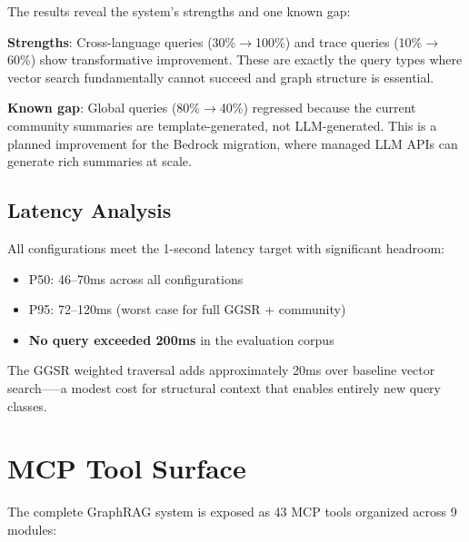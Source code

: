 \documentclass[11pt,letterpaper]{article}
\begin{document}
The results reveal the system's strengths and one known gap:

\textbf{Strengths}: Cross-language queries (30\%$\to$100\%) and trace
queries (10\%$\to$60\%) show transformative improvement. These are
exactly the query types where vector search fundamentally cannot succeed
and graph structure is essential.

\textbf{Known gap}: Global queries (80\%$\to$40\%) regressed because
the current community summaries are template-generated, not LLM-generated.
This is a planned improvement for the Bedrock migration, where managed
LLM APIs can generate rich summaries at scale.

\subsection{Latency Analysis}

All configurations meet the 1-second latency target with significant
headroom:

\begin{itemize}[nosep]
    \item P50: 46--70ms across all configurations
    \item P95: 72--120ms (worst case for full GGSR + community)
    \item \textbf{No query exceeded 200ms} in the evaluation corpus
\end{itemize}

The GGSR weighted traversal adds approximately 20ms over baseline vector
search--—a modest cost for structural context that enables entirely new
query classes.

\section{MCP Tool Surface}
\label{sec:tools}

The complete GraphRAG system is exposed as 43 MCP tools organized
across 9 modules:
\end{document}
